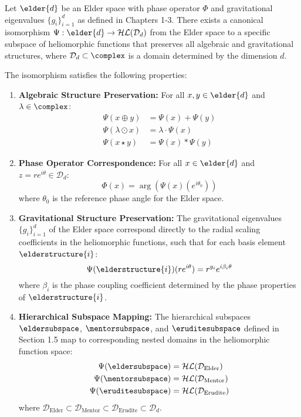 \begin{theorem}
\label{thm:elder_heliomorphic_isomorphism}
Let $\elder{d}$ be an Elder space with phase operator $\Phi$ and gravitational eigenvalues $\{g_i\}_{i=1}^d$ as defined in Chapters 1-3. There exists a canonical isomorphism $\Psi: \elder{d} \rightarrow \mathcal{HL}(\mathcal{D}_d)$ from the Elder space to a specific subspace of heliomorphic functions that preserves all algebraic and gravitational structures, where $\mathcal{D}_d \subset \complex$ is a domain determined by the dimension $d$.

The isomorphism satisfies the following properties:
\begin{enumerate}
    \item \textbf{Algebraic Structure Preservation:} For all $x, y \in \elder{d}$ and $\lambda \in \complex$:
    \begin{align}
        \Psi(x \oplus y) &= \Psi(x) + \Psi(y) \\
        \Psi(\lambda \odot x) &= \lambda \cdot \Psi(x) \\
        \Psi(x \star y) &= \Psi(x) * \Psi(y)
    \end{align}
    
    \item \textbf{Phase Operator Correspondence:} For all $x \in \elder{d}$ and $z = re^{i\theta} \in \mathcal{D}_d$:
    \begin{equation}
        \Phi(x) = \arg(\Psi(x)(e^{i\theta_0}))
    \end{equation}
    where $\theta_0$ is the reference phase angle for the Elder space.
    
    \item \textbf{Gravitational Structure Preservation:} The gravitational eigenvalues $\{g_i\}_{i=1}^d$ of the Elder space correspond directly to the radial scaling coefficients in the heliomorphic functions, such that for each basis element $\elderstructure{i}$:
    \begin{equation}
        \Psi(\elderstructure{i})(re^{i\theta}) = r^{g_i} e^{i\beta_i\theta}
    \end{equation}
    where $\beta_i$ is the phase coupling coefficient determined by the phase properties of $\elderstructure{i}$.
    
    \item \textbf{Hierarchical Subspace Mapping:} The hierarchical subspaces $\eldersubspace$, $\mentorsubspace$, and $\eruditesubspace$ defined in Section 1.5 map to corresponding nested domains in the heliomorphic function space:
    \begin{align}
        \Psi(\eldersubspace) &= \mathcal{HL}(\mathcal{D}_{\text{Elder}}) \\
        \Psi(\mentorsubspace) &= \mathcal{HL}(\mathcal{D}_{\text{Mentor}}) \\
        \Psi(\eruditesubspace) &= \mathcal{HL}(\mathcal{D}_{\text{Erudite}})
    \end{align}
    where $\mathcal{D}_{\text{Elder}} \subset \mathcal{D}_{\text{Mentor}} \subset \mathcal{D}_{\text{Erudite}} \subset \mathcal{D}_d$.
\end{enumerate}
\end{theorem}

